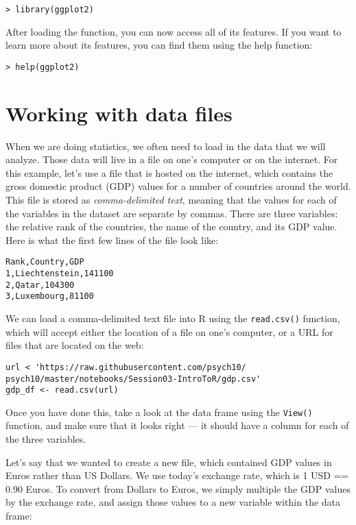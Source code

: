 \documentclass[12pt,]{book}
\begin{document}
\begin{verbatim}
> library(ggplot2)
\end{verbatim}

After loading the function, you can now access all of its features. If you want to learn more about its features, you can find them using the help function:

\begin{verbatim}
> help(ggplot2)
\end{verbatim}

\hypertarget{working-with-data-files}{%
\section{Working with data files}\label{working-with-data-files}}

When we are doing statistics, we often need to load in the data that we will analyze. Those data will live in a file on one's computer or on the internet. For this example, let's use a file that is hosted on the internet, which contains the gross domestic product (GDP) values for a number of countries around the world. This file is stored as \emph{comma-delimited text}, meaning that the values for each of the variables in the dataset are separate by commas. There are three variables: the relative rank of the countries, the name of the country, and its GDP value. Here is what the first few lines of the file look like:

\begin{verbatim}
Rank,Country,GDP
1,Liechtenstein,141100
2,Qatar,104300
3,Luxembourg,81100
\end{verbatim}

We can load a comma-delimited text file into R using the \texttt{read.csv()} function, which will accept either the location of a file on one's computer, or a URL for files that are located on the web:

\begin{verbatim}
url < 'https://raw.githubusercontent.com/psych10/
psych10/master/notebooks/Session03-IntroToR/gdp.csv'
gdp_df <- read.csv(url)
\end{verbatim}

Once you have done this, take a look at the data frame using the \texttt{View()} function, and make sure that it looks right --- it should have a column for each of the three variables.

Let's say that we wanted to create a new file, which contained GDP values in Euros rather than US Dollars. We use today's exchange rate, which is 1 USD == 0.90 Euros. To convert from Dollars to Euros, we simply multiple the GDP values by the exchange rate, and assign those values to a new variable within the data frame:
\end{document}

